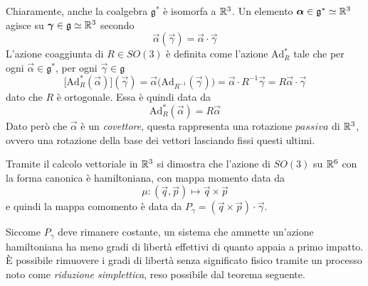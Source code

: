 Chiaramente, anche la coalgebra $\mathfrak{g}^*$ è isomorfa a $\mathbb{R}^3$. Un elemento $\boldsymbol{\alpha} \in \mathfrak{g}^* \simeq \mathbb{R}^3$ agisce su $\boldsymbol{\gamma} \in \mathfrak{g} \simeq \mathbb{R}^3$ secondo
\begin{equation*}
\vec{\alpha}(\vec{\gamma}) = \vec{\alpha} \cdot \vec{\gamma}
\end{equation*} 
L'azione coaggiunta di $R \in SO(3)$ è definita come l'azione $\mathrm{Ad}^*_R$ tale che per ogni $\vec{\alpha} \in \mathfrak{g}^*$, per ogni $\vec{\gamma} \in \mathfrak{g}$
\begin{equation*}
  \big[\mathrm{Ad}^*_R(\vec{\alpha})\big](\vec{\gamma}) = \vec{\alpha}\big(\mathrm{Ad}_{R^{-1}}(\vec{\gamma})\big) = \vec{\alpha} \cdot R^{-1}\vec{\gamma} = R \vec{\alpha} \cdot \vec{\gamma}
\end{equation*} 
dato che $R$ è ortogonale. Essa è quindi data da
\begin{equation*}
\mathrm{Ad}^*_R(\vec{\alpha}) = R\vec{\alpha}
\end{equation*} 
Dato però che $\vec{\alpha}$ è un \emph{covettore}, questa rappresenta una rotazione $passiva$ di $\mathbb{R}^3$, ovvero una rotazione della base dei vettori lasciando fissi questi ultimi.

Tramite il calcolo vettoriale in $\mathbb{R}^3$ si dimostra che l'azione di $SO(3)$ su $\mathbb{R}^6$ con la forma canonica è hamiltoniana, con mappa momento data da 
\begin{equation*}
\mu: (\vec{q},\vec{p}) \mapsto \vec{q} \times \vec{p}
\end{equation*} 
e quindi la mappa comomento è data da $P_{\gamma}=(\vec{q} \times \vec{p}) \cdot  \vec{\gamma}$.

Siccome $P_\gamma$ deve rimanere costante, un sistema che ammette un'azione hamiltoniana ha meno gradi di libertà effettivi di quanto appaia a primo impatto. È possibile rimuovere i gradi di libertà senza significato fisico tramite un processo noto come \emph{riduzione simplettica}, reso possibile dal teorema seguente.

